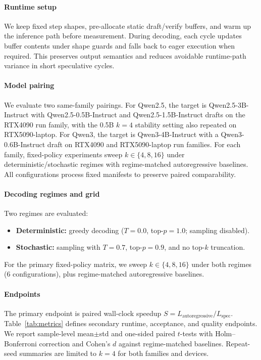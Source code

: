 \paragraph{Runtime setup}
We keep fixed step shapes, pre-allocate static draft/verify buffers, and warm
up the inference path before measurement. During decoding, each cycle updates
buffer contents under shape guards and falls back to eager execution when
required. This preserves output semantics and reduces avoidable runtime-path
variance in short speculative cycles.

\paragraph{Model pairing}
We evaluate two same-family pairings.
For Qwen2.5, the target is Qwen2.5-3B-Instruct with
Qwen2.5-0.5B-Instruct and Qwen2.5-1.5B-Instruct drafts on the RTX4090 run
family, with the 0.5B $k{=}4$ stability setting also repeated on
RTX5090-laptop. For Qwen3, the target is Qwen3-4B-Instruct with a
Qwen3-0.6B-Instruct draft on RTX4090 and RTX5090-laptop run families.
For each family, fixed-policy experiments sweep $k\in\{4,8,16\}$ under
deterministic/stochastic regimes with regime-matched autoregressive baselines.
All configurations process fixed manifests to preserve paired comparability.

\paragraph{Decoding regimes and grid}
Two regimes are evaluated:
\begin{itemize}
    \item \textbf{Deterministic:} greedy decoding ($T{=}0.0$, top-$p{=}1.0$; sampling disabled).
    \item \textbf{Stochastic:} sampling with $T{=}0.7$, top-$p{=}0.9$, and no top-$k$ truncation.
\end{itemize}
For the primary fixed-policy matrix, we sweep $k\in\{4,8,16\}$ under both
regimes (6 configurations), plus regime-matched autoregressive baselines.

\paragraph{Endpoints}
The primary endpoint is paired wall-clock speedup
$S=L_{\text{autoregressive}}/L_{\text{spec}}$. Table~\ref{tab:metrics}
defines secondary runtime, acceptance, and quality endpoints. We report
sample-level mean$\pm$std and one-sided paired $t$-tests with Holm--Bonferroni
correction and Cohen's $d$ against regime-matched baselines. Repeat-seed
summaries are limited to $k{=}4$ for both families and devices.
